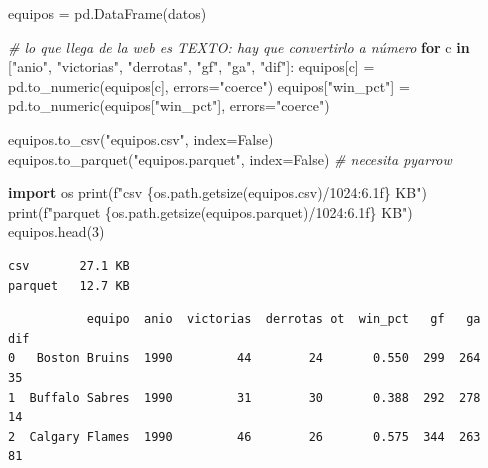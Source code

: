 \documentclass[
]{article}
\newenvironment{Shaded}{}{}
\newcommand{\BuiltInTok}[1]{\textcolor[rgb]{0.00,0.50,0.00}{#1}}
\newcommand{\CommentTok}[1]{\textcolor[rgb]{0.38,0.63,0.69}{\textit{#1}}}
\newcommand{\ControlFlowTok}[1]{\textcolor[rgb]{0.00,0.44,0.13}{\textbf{#1}}}
\newcommand{\DecValTok}[1]{\textcolor[rgb]{0.25,0.63,0.44}{#1}}
\newcommand{\ImportTok}[1]{\textcolor[rgb]{0.00,0.50,0.00}{\textbf{#1}}}
\newcommand{\KeywordTok}[1]{\textcolor[rgb]{0.00,0.44,0.13}{\textbf{#1}}}
\newcommand{\NormalTok}[1]{#1}
\newcommand{\OperatorTok}[1]{\textcolor[rgb]{0.40,0.40,0.40}{#1}}
\newcommand{\SpecialCharTok}[1]{\textcolor[rgb]{0.25,0.44,0.63}{#1}}
\newcommand{\SpecialStringTok}[1]{\textcolor[rgb]{0.73,0.40,0.53}{#1}}
\newcommand{\StringTok}[1]{\textcolor[rgb]{0.25,0.44,0.63}{#1}}
\newcommand{\VariableTok}[1]{\textcolor[rgb]{0.10,0.09,0.49}{#1}}
\begin{document}
\protect{}\label{24d3c94b}
\begin{Shaded}
\begin{Highlighting}[]
\NormalTok{equipos }\OperatorTok{=}\NormalTok{ pd.DataFrame(datos)}

\CommentTok{\# lo que llega de la web es TEXTO: hay que convertirlo a número}
\ControlFlowTok{for}\NormalTok{ c }\KeywordTok{in}\NormalTok{ [}\StringTok{"anio"}\NormalTok{, }\StringTok{"victorias"}\NormalTok{, }\StringTok{"derrotas"}\NormalTok{, }\StringTok{"gf"}\NormalTok{, }\StringTok{"ga"}\NormalTok{, }\StringTok{"dif"}\NormalTok{]:}
\NormalTok{    equipos[c] }\OperatorTok{=}\NormalTok{ pd.to\_numeric(equipos[c], errors}\OperatorTok{=}\StringTok{"coerce"}\NormalTok{)}
\NormalTok{equipos[}\StringTok{"win\_pct"}\NormalTok{] }\OperatorTok{=}\NormalTok{ pd.to\_numeric(equipos[}\StringTok{"win\_pct"}\NormalTok{], errors}\OperatorTok{=}\StringTok{"coerce"}\NormalTok{)}

\NormalTok{equipos.to\_csv(}\StringTok{"equipos.csv"}\NormalTok{, index}\OperatorTok{=}\VariableTok{False}\NormalTok{)}
\NormalTok{equipos.to\_parquet(}\StringTok{"equipos.parquet"}\NormalTok{, index}\OperatorTok{=}\VariableTok{False}\NormalTok{)   }\CommentTok{\# necesita pyarrow}

\ImportTok{import}\NormalTok{ os}
\BuiltInTok{print}\NormalTok{(}\SpecialStringTok{f"csv     }\SpecialCharTok{\{}\NormalTok{os}\SpecialCharTok{.}\NormalTok{path}\SpecialCharTok{.}\NormalTok{getsize(}\StringTok{\textquotesingle{}equipos.csv\textquotesingle{}}\NormalTok{)}\OperatorTok{/}\DecValTok{1024}\SpecialCharTok{:6.1f\}}\SpecialStringTok{ KB"}\NormalTok{)}
\BuiltInTok{print}\NormalTok{(}\SpecialStringTok{f"parquet }\SpecialCharTok{\{}\NormalTok{os}\SpecialCharTok{.}\NormalTok{path}\SpecialCharTok{.}\NormalTok{getsize(}\StringTok{\textquotesingle{}equipos.parquet\textquotesingle{}}\NormalTok{)}\OperatorTok{/}\DecValTok{1024}\SpecialCharTok{:6.1f\}}\SpecialStringTok{ KB"}\NormalTok{)}
\NormalTok{equipos.head(}\DecValTok{3}\NormalTok{)}
\end{Highlighting}
\end{Shaded}

\begin{verbatim}
csv       27.1 KB
parquet   12.7 KB
\end{verbatim}

\begin{verbatim}
           equipo  anio  victorias  derrotas ot  win_pct   gf   ga  dif
0   Boston Bruins  1990         44        24       0.550  299  264   35
1  Buffalo Sabres  1990         31        30       0.388  292  278   14
2  Calgary Flames  1990         46        26       0.575  344  263   81
\end{verbatim}
\end{document}
